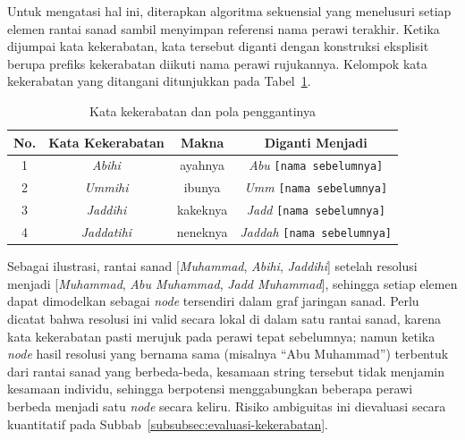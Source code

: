Untuk mengatasi hal ini, diterapkan algoritma sekuensial yang menelusuri setiap elemen rantai sanad sambil menyimpan referensi nama perawi terakhir. Ketika dijumpai kata kekerabatan, kata tersebut diganti dengan konstruksi eksplisit berupa prefiks kekerabatan diikuti nama perawi rujukannya. Kelompok kata kekerabatan yang ditangani ditunjukkan pada Tabel~\ref{tab:kekerabatan}.

\begin{table}[H]
\centering
\caption{Kata kekerabatan dan pola penggantinya}
\label{tab:kekerabatan}
\renewcommand{\arraystretch}{1.4}
\begin{tabular}{|c|c|c|c|}
\hline
\textbf{No.} & \textbf{Kata Kekerabatan} & \textbf{Makna} & \textbf{Diganti Menjadi} \\
\hline
1 & \textit{Abihi} & ayahnya & \textit{Abu} \texttt{[nama sebelumnya]} \\
\hline
2 & \textit{Ummihi} & ibunya & \textit{Umm} \texttt{[nama sebelumnya]} \\
\hline
3 & \textit{Jaddihi} & kakeknya & \textit{Jadd} \texttt{[nama sebelumnya]} \\
\hline
4 & \textit{Jaddatihi} & neneknya & \textit{Jaddah} \texttt{[nama sebelumnya]} \\
\hline
\end{tabular}
\end{table}

Sebagai ilustrasi, rantai sanad [\textit{Muhammad}, \textit{Abihi}, \textit{Jaddihi}] setelah resolusi menjadi [\textit{Muhammad}, \textit{Abu Muhammad}, \textit{Jadd Muhammad}], sehingga setiap elemen dapat dimodelkan sebagai \textit{node} tersendiri dalam graf jaringan sanad. Perlu dicatat bahwa resolusi ini valid secara lokal di dalam satu rantai sanad, karena kata kekerabatan pasti merujuk pada perawi tepat sebelumnya; namun ketika \textit{node} hasil resolusi yang bernama sama (misalnya ``Abu Muhammad'') terbentuk dari rantai sanad yang berbeda-beda, kesamaan string tersebut tidak menjamin kesamaan individu, sehingga berpotensi menggabungkan beberapa perawi berbeda menjadi satu \textit{node} secara keliru. Risiko ambiguitas ini dievaluasi secara kuantitatif pada Subbab~\ref{subsubsec:evaluasi-kekerabatan}.

